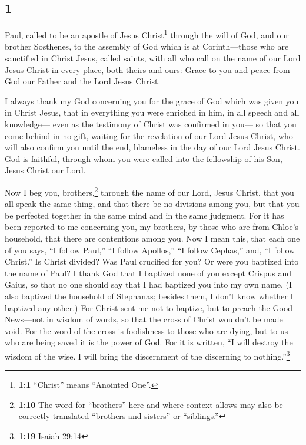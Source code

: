 \begin{paracol}{2}
\begin{otherlanguage}{english}
\hypertarget{section-1}{%
\section{1}\label{section-1}}

 Paul, called to be an apostle of Jesus Christ\footnote{\textbf{1:1}
  ``Christ'' means ``Anointed One''.} through the will of God, and our
brother Sosthenes,  to the assembly of God which is at
Corinth---those who are sanctified in Christ Jesus, called saints, with
all who call on the name of our Lord Jesus Christ in every place, both
theirs and ours:  Grace to you and peace from God our
Father and the Lord Jesus Christ.

 I always thank my God concerning you for the grace of God
which was given you in Christ Jesus,  that in everything
you were enriched in him, in all speech and all knowledge---
 even as the testimony of Christ was confirmed in you---
 so that you come behind in no gift, waiting for the
revelation of our Lord Jesus Christ,  who will also
confirm you until the end, blameless in the day of our Lord Jesus
Christ.  God is faithful, through whom you were called
into the fellowship of his Son, Jesus Christ our Lord.

 Now I beg you, brothers,\footnote{\textbf{1:10} The word
  for ``brothers'' here and where context allows may also be correctly
  translated ``brothers and sisters'' or ``siblings.''} through the name
of our Lord, Jesus Christ, that you all speak the same thing, and that
there be no divisions among you, but that you be perfected together in
the same mind and in the same judgment.  For it has been
reported to me concerning you, my brothers, by those who are from
Chloe's household, that there are contentions among you. 
Now I mean this, that each one of you says, ``I follow Paul,'' ``I
follow Apollos,'' ``I follow Cephas,'' and, ``I follow Christ.''
 Is Christ divided? Was Paul crucified for you? Or were
you baptized into the name of Paul?  I thank God that I
baptized none of you except Crispus and Gaius,  so that
no one should say that I had baptized you into my own name.
 (I also baptized the household of Stephanas; besides
them, I don't know whether I baptized any other.)  For
Christ sent me not to baptize, but to preach the Good News---not in
wisdom of words, so that the cross of Christ wouldn't be made void.
 For the word of the cross is foolishness to those who
are dying, but to us who are being saved it is the power of God.
 For it is written, ``I will destroy the wisdom of the
wise. I will bring the discernment of the discerning to
nothing.''\footnote{\textbf{1:19} Isaiah 29:14}


\end{otherlanguage}
\end{paracol}
